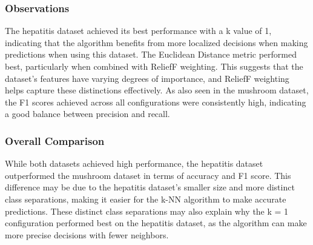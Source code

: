 \subsubsection*{Observations}
The hepatitis dataset achieved its best performance with a k value of 1, indicating that the algorithm benefits from
more localized decisions when making predictions when using this dataset.
The Euclidean Distance metric performed best, particularly when combined with ReliefF weighting. This suggests that the dataset's features
have varying degrees of importance, and ReliefF weighting helps capture these distinctions effectively.
As also seen in the mushroom dataset, the F1 scores achieved across all configurations were consistently high,
indicating a good balance between precision and recall.


\subsubsection{Overall Comparison}
While both datasets achieved high performance, the hepatitis dataset outperformed the mushroom dataset in terms of accuracy and F1 score.
This difference may be due to the hepatitis dataset's smaller size and more distinct class separations,
making it easier for the k-NN algorithm to make accurate predictions. These distinct class separations may also explain why the k = 1 configuration
performed best on the hepatitis dataset, as the algorithm can make more precise decisions with fewer neighbors.



